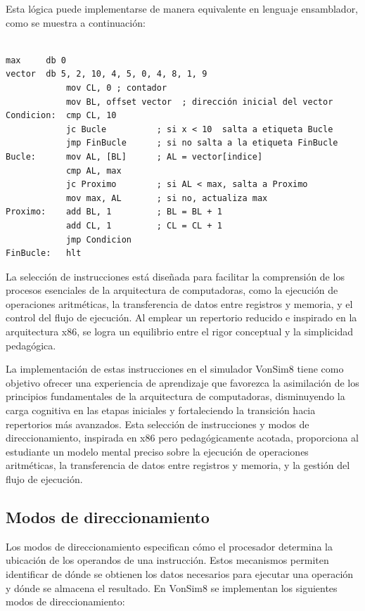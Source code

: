\documentclass[12pt,oneside]{templates/unerthesis}
\begin{document}
Esta lógica puede implementarse de manera equivalente en lenguaje ensamblador, como se muestra a continuación:

\begin{lstlisting}[breaklines=true]

max     db 0
vector  db 5, 2, 10, 4, 5, 0, 4, 8, 1, 9
            mov CL, 0 ; contador
            mov BL, offset vector  ; dirección inicial del vector
Condicion:  cmp CL, 10 
            jc Bucle          ; si x < 10  salta a etiqueta Bucle
            jmp FinBucle      ; si no salta a la etiqueta FinBucle
Bucle:      mov AL, [BL]      ; AL = vector[indice] 
            cmp AL, max
            jc Proximo        ; si AL < max, salta a Proximo
            mov max, AL       ; si no, actualiza max
Proximo:    add BL, 1         ; BL = BL + 1 
            add CL, 1         ; CL = CL + 1            
            jmp Condicion 
FinBucle:   hlt
\end{lstlisting}

La selección de instrucciones está diseñada para facilitar la comprensión de los procesos esenciales de la arquitectura de computadoras, como la ejecución de operaciones aritméticas, la transferencia de datos entre registros y memoria, y el control del flujo de ejecución. Al emplear un repertorio reducido e inspirado en la arquitectura x86, se logra un equilibrio entre el rigor conceptual y la simplicidad pedagógica.

La implementación de estas instrucciones en el simulador VonSim8 tiene como objetivo ofrecer una experiencia de aprendizaje que favorezca la asimilación de los principios fundamentales de la arquitectura de computadoras, disminuyendo la carga cognitiva en las etapas iniciales y fortaleciendo la transición hacia repertorios más avanzados. Esta selección de instrucciones y modos de direccionamiento, inspirada en x86 pero pedagógicamente acotada, proporciona al estudiante un modelo mental preciso sobre la ejecución de operaciones aritméticas, la transferencia de datos entre registros y memoria, y la gestión del flujo de ejecución.

\hypertarget{modos-de-direccionamiento-1}{%
\subsection{Modos de direccionamiento}\label{modos-de-direccionamiento-1}}

Los modos de direccionamiento especifican cómo el procesador determina la ubicación de los operandos de una instrucción. Estos mecanismos permiten identificar de dónde se obtienen los datos necesarios para ejecutar una operación y dónde se almacena el resultado. En VonSim8 se implementan los siguientes modos de direccionamiento:
\end{document}
